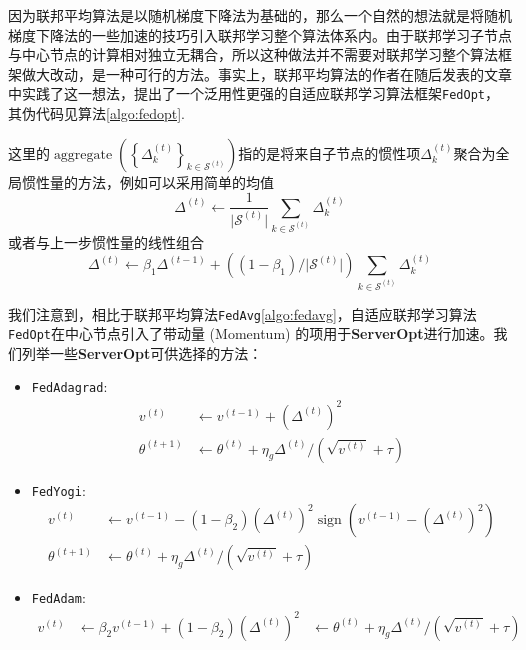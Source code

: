 因为联邦平均算法是以随机梯度下降法为基础的，那么一个自然的想法就是将随机梯度下降法的一些加速的技巧\cite{adagrad, adam, Zaheer_2018_yogi, adamw_amsgrad}引入联邦学习整个算法体系内。由于联邦学习子节点与中心节点的计算相对独立无耦合，所以这种做法并不需要对联邦学习整个算法框架做大改动，是一种可行的方法。事实上，联邦平均算法的作者在随后发表的文章\parencite{reddi2020fed_opt}中实践了这一想法，提出了一个泛用性更强的自适应联邦学习算法框架\texttt{FedOpt}，其伪代码见算法\ref{algo:fedopt}. 



这里的$\operatorname{aggregate} \left( \left\{ \Delta_{k}^{(t)} \right\}_{k \in \mathcal{S}^{(t)}} \right)$指的是将来自子节点的惯性项$\Delta_{k}^{(t)}$聚合为全局惯性量的方法，例如可以采用简单的均值
\begin{equation*}
\Delta^{(t)} \gets \frac{1}{\lvert \mathcal{S}^{(t)} \rvert} \sum\limits_{k \in \mathcal{S}^{(t)}} \Delta_{k}^{(t)}
\end{equation*}
或者与上一步惯性量的线性组合
\begin{equation*}
\Delta^{(t)} \gets \beta_1 \Delta^{(t-1)} + \left( (1 - \beta_1) / \lvert \mathcal{S}^{(t)} \rvert \right) \sum_{k \in \mathcal{S}^{(t)}} \Delta_{k}^{(t)}
\end{equation*}

我们注意到，相比于联邦平均算法\texttt{FedAvg}\ref{algo:fedavg}，自适应联邦学习算法\texttt{FedOpt}在中心节点引入了带动量 (Momentum) 的项用于\textbf{ServerOpt}进行加速。我们列举一些\textbf{ServerOpt}可供选择的方法\cite{reddi2020fed_opt}：
\begin{itemize}
    \item \texttt{FedAdagrad}:
    \begin{equation*}
    \begin{aligned}
    v^{(t)} & \gets v^{(t-1)} + ( \Delta^{(t)} )^2 \\
    \theta^{(t+1)} & \gets \theta^{(t)} + \eta_g \Delta^{(t)} / (\sqrt{v^{(t)}}+\tau)
    \end{aligned}
    \end{equation*}
    \item \texttt{FedYogi}:
    \begin{equation*}
    \begin{aligned}
    v^{(t)} & \gets v^{(t-1)} - (1 - \beta_2) ( \Delta^{(t)} )^2 \operatorname{sign}(v^{(t-1)} - ( \Delta^{(t)} )^2) \\
    \theta^{(t+1)} & \gets \theta^{(t)} + \eta_g \Delta^{(t)} / (\sqrt{v^{(t)}}+\tau)
    \end{aligned}
    \end{equation*}
    \item \texttt{FedAdam}:
    \begin{equation*}
    \begin{aligned}
    v^{(t)} & \gets \beta_2 v^{(t-1)} + (1 - \beta_2) ( \Delta^{(t)} )^2 & \gets \theta^{(t)} + \eta_g \Delta^{(t)} / (\sqrt{v^{(t)}}+\tau)
    \end{aligned}
    \end{equation*}
\end{itemize}

